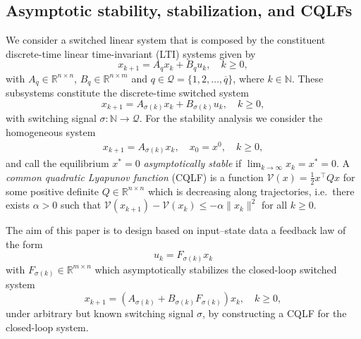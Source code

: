 \documentclass[11pt]{article}
\newcommand{\R}{\mathbb{R}}
\newcommand{\N}{\mathbb{N}}
\theoremstyle{plain}
\theoremstyle{definition}
\theoremstyle{remark}
\begin{document}
\subsection{Asymptotic stability, stabilization, and CQLFs}
\label{ssec:cqlfs}
We consider a switched linear system that is composed by the constituent discrete-time linear time-invariant (LTI) systems given by
\begin{equation}
    x_{k+1} = A_{q} x_k + B_{q} u_k,\quad k\geq 0,
\end{equation}
with $A_q\in\R^{n\times n}$, $B_q\in\R^{n\times m}$ and $q\in\mathcal Q=\{1,2,\dots, \overline q\}$,  where $k\in\N$. These subsystems  constitute the discrete-time switched system
\begin{equation}
    \label{eq:switched_sys}
    x_{k+1} = A_{\sigma(k)} x_k + B_{\sigma(k)} u_k,\quad k\geq 0,
\end{equation}
with switching signal $\sigma: \N \to \mathcal Q$. For the stability analysis we consider the homogeneous system
\begin{align}
    \label{eq:homo}
 x_{k+1} = A_{\sigma(k)}x_{k},\quad  x_0=x^0, \quad k\geq 0,
\end{align}
and call the equilibrium $x^*=0$ \emph{asymptotically stable} if $\lim_{k\rightarrow\infty} x_k=x^*=0$. A \emph{common quadratic Lyapunov function} (CQLF) is a function $\mathcal{V}(x)=\tfrac{1}{2}x^\top Qx$ for some positive definite $Q\in\mathbb{R}^{n\times n}$ which is decreasing along trajectories, i.e.\ there exists $\alpha>0$ such that $\mathcal{V}(x_{k+1})-\mathcal{V}(x_{k})\leq -\alpha \|x_k\|^2$ for all $k\geq 0$.

The aim of this paper is to design based on input--state data a feedback law of the form
\begin{equation}
    \label{eq:feedback_law}
    u_k = F_{\sigma(k)} x_k
\end{equation} with $F_{\sigma(k)}\in \R^{m\times n}$ which asymptotically stabilizes the closed-loop switched system
\begin{equation}
    x_{k+1} = (A_{\sigma(k)} + B_{\sigma(k)}F_{\sigma(k)}) x_k,\quad k\geq 0,
\end{equation}
under arbitrary but known switching signal $\sigma$, by constructing a CQLF for the closed-loop system.
\end{document}
